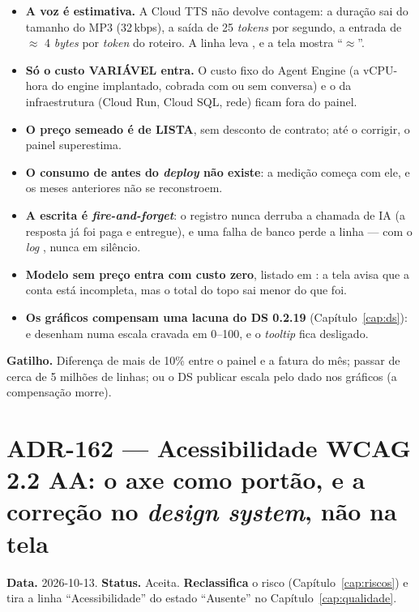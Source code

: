 \begin{itemize}
  \item \textbf{A voz é estimativa.} A Cloud TTS não devolve contagem: a
    duração sai do tamanho do MP3 (32\,kbps), a saída de 25 \emph{tokens} por
    segundo, a entrada de $\approx$ 4 \emph{bytes} por \emph{token} do roteiro.
    A linha leva , e a tela mostra \enquote{$\approx$}.
  \item \textbf{Só o custo VARIÁVEL entra.} O custo fixo do Agent Engine (a
    vCPU-hora do engine implantado, cobrada com ou sem conversa) e o da
    infraestrutura (Cloud Run, Cloud SQL, rede) ficam fora do painel.
  \item \textbf{O preço semeado é de LISTA}, sem desconto de contrato; até o
     corrigir, o painel superestima.
  \item \textbf{O consumo de antes do \emph{deploy} não existe}: a medição
    começa com ele, e os meses anteriores não se reconstroem.
  \item \textbf{A escrita é \emph{fire-and-forget}}: o registro nunca derruba a
    chamada de IA (a resposta já foi paga e entregue), e uma falha de banco
    perde a linha --- com o \emph{log} , nunca em
    silêncio.
  \item \textbf{Modelo sem preço entra com custo zero}, listado em
    : a tela avisa que a conta está incompleta, mas o total
    do topo sai menor do que foi.
  \item \textbf{Os gráficos compensam uma lacuna do DS 0.2.19}
    (Capítulo~\ref{cap:ds}):  e  desenham numa escala
    cravada em 0--100, e o \emph{tooltip} fica desligado.
\end{itemize}

\textbf{Gatilho.} Diferença de mais de 10\% entre o painel e a fatura do mês;
 passar de cerca de 5 milhões de linhas; ou o DS
publicar escala pelo dado nos gráficos (a compensação morre).
\section{ADR-162 --- Acessibilidade WCAG 2.2 AA: o axe como portão, e a correção no \emph{design system}, não na tela}
\label{adr:acessibilidade-aa}

\textbf{Data.} 2026-10-13. \textbf{Status.} Aceita. \textbf{Reclassifica} o
risco  (Capítulo~\ref{cap:riscos}) e tira a linha
\enquote{Acessibilidade} do estado \enquote{Ausente} no
Capítulo~\ref{cap:qualidade}.

